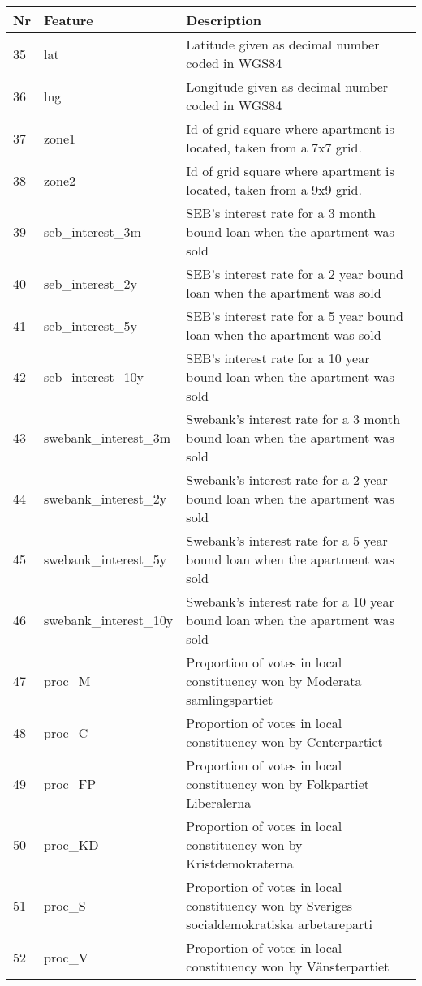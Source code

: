 \begin{table}[H]
\begin{tabular}{ | l | l | p{7cm} | } 
\hline 
Nr & Feature & Description \\
\hline
\hline
35 & lat & Latitude given as decimal number coded in WGS84 \\
36 & lng & Longitude given as decimal number coded in WGS84 \\
37 & zone1 & Id of grid square where apartment is located, taken from a 7x7 grid. \\
38 & zone2 & Id of grid square where apartment is located, taken from a 9x9 grid. \\
\hline
39 & seb\_interest\_3m & SEB's interest rate for a 3 month bound loan when the apartment was sold \\
40 & seb\_interest\_2y & SEB's interest rate for a 2 year bound loan when the apartment was sold \\
41 & seb\_interest\_5y & SEB's interest rate for a 5 year bound loan when the apartment was sold \\
42 & seb\_interest\_10y & SEB's interest rate for a 10 year bound loan when the apartment was sold \\
43 & swebank\_interest\_3m & Swebank's  interest rate for a 3 month bound loan when the apartment was sold\\
44 & swebank\_interest\_2y & Swebank's interest rate for a 2 year bound loan when the apartment was sold \\
45 & swebank\_interest\_5y & Swebank's interest rate for a 5 year bound loan when the apartment was sold \\
46 & swebank\_interest\_10y & Swebank's interest rate for a 10 year bound loan when the apartment was sold \\
\hline
47 & proc\_M & Proportion of votes in local constituency won by Moderata samlings\-partiet \\
48 & proc\_C & Proportion of votes in local constituency won by Centerpartiet \\
49 & proc\_FP & Proportion of votes in local constituency won by Folkpartiet Liberalerna \\
50 & proc\_KD & Proportion of votes in local constituency won by Kristdemokraterna \\
51 & proc\_S & Proportion of votes in local constituency won by Sveriges social\-demo\-kratiska arbetare\-parti \\
52 & proc\_V & Proportion of votes in local constituency won by V{\"a}nsterpartiet \\

\end{tabular}
\end{table}
